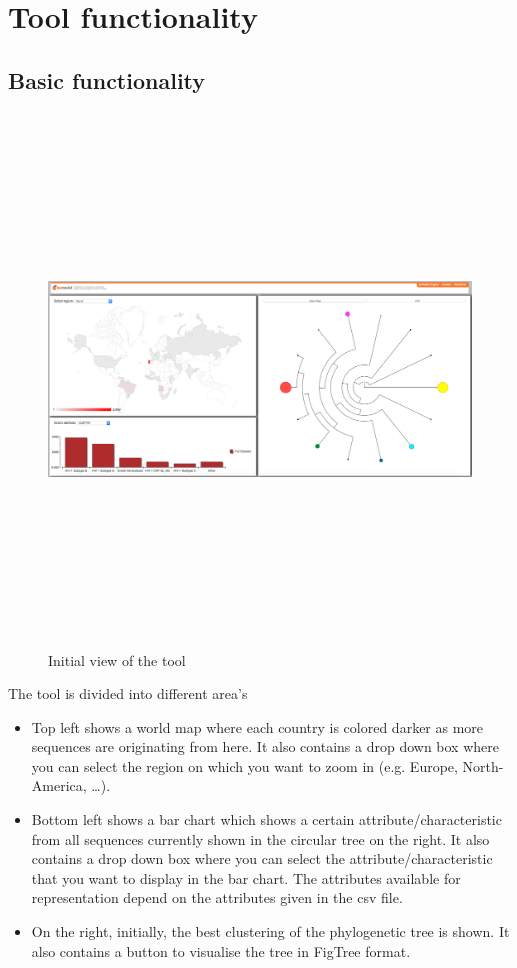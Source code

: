 \documentclass[a4paper, 11pt]{article} %
\begin{document}
\section{Tool functionality}
\subsection{Basic functionality}

\begin{figure}[H]
\centering
\includegraphics[width=400pt, height=400pt, keepaspectratio=true]{images/initial_view.PNG}
\caption{Initial view of the tool}
\label{fig:initial_view}
\end{figure}

The tool is divided into different area's
\begin{itemize}
  \item Top left shows a world map where each country is colored darker as more sequences are originating from here. It also contains a drop down box where you can select the region on which you want to zoom in (e.g. Europe, North-America, \ldots).
  \item Bottom left shows a bar chart which shows a certain attribute/characteristic from all sequences currently shown in the circular tree on the right. It also contains a drop down box where you can select the attribute/characteristic that you want to display in the bar chart. The attributes available for representation depend on the attributes given in the csv file.
  \item On the right, initially, the best clustering of the phylogenetic tree is shown. It also contains a button to visualise the tree in FigTree format.
\end{itemize}
\end{document}
